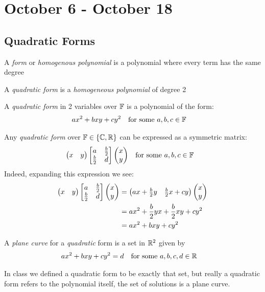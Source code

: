 \chapter{October 6 - October 18}

\section{Quadratic Forms}

\begin{definition}[Forms]
  A \emph{form} or \emph{homogenous polynomial} is a polynomial where every term has the same degree
\end{definition}

\begin{definition}
  A \emph{quadratic form} is a \emph{homogeneous polynomial} of degree 2
\end{definition}

\begin{remark}
  A \emph{quadratic form} in 2 variables over $\mathbb{F}$ is a polynomial of the form:
    \begin{align}
      &ax^2 + bxy + cy^2 & \text{for some }& a, b, c \in \mathbb{F}
    \end{align}
\end{remark}

\begin{remark}
  Any \emph{quadratic form} over $\mathbb{F} \in \left\{\mathbb{C}, \mathbb{R}\right\}$ can be expressed as a symmetric matrix:
    \begin{align}
      &\begin{pmatrix}x & y\end{pmatrix} \begin{bmatrix}a & \frac{b}{2} \\ \frac{b}{2} & d\end{bmatrix} \begin{pmatrix}x \\ y\end{pmatrix}
      & \text{for some }& a, b, c \in \mathbb{F}
    \end{align}
  Indeed, expanding this expression we see:
    \begin{align}
      \begin{pmatrix}x & y\end{pmatrix} \begin{bmatrix}a & \frac{b}{2} \\ \frac{b}{2} & d\end{bmatrix} \begin{pmatrix}x \\ y\end{pmatrix}
        &= \begin{pmatrix}ax + \frac{b}{2}y & \frac{b}{2}x + cy\end{pmatrix}\begin{pmatrix}x \\ y\end{pmatrix} \\
        &= ax^2 + \frac{b}{2}yx + \frac{b}{2}xy + cy^2 \\
        &= ax^2 + bxy + cy^2
    \end{align}
\end{remark}

\begin{definition}
  A \emph{plane curve} for a \emph{quadratic} form is a set in $\mathbb{R}^2$ given by
    \begin{align}
      ax^2 + bxy + cy^2&=d & \text{for some }& a, b, c, d \in \mathbb{R}
    \end{align}
\end{definition}
\begin{remark}
  In class we defined a quadratic form to be exactly that set, but really a quadratic form refers to the polynomial itself,
  the set of solutions is a plane curve.
\end{remark}

